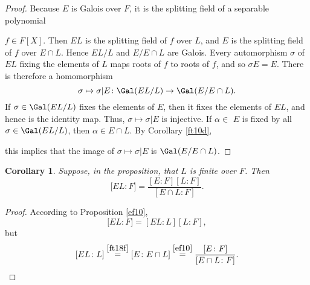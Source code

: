 \documentclass[a4paper,11pt,final,openany]{memoir}
\newtheorem{corollary}[X]{Corollary}
\theoremstyle{nonumberplain}
\newtheorem{proof}{Proof.}
\begin{document}
\begin{proof}
Because $E$ is Galois over $F$, it is the splitting field of a separable polynomial

$f\in F[X]$. Then $EL$ is the splitting field of $f$ over
$L$, and $E$ is the splitting field of $f$ over $E\cap L$. Hence $EL/L$ and
$E/E\cap L$ are Galois.
Every automorphism $\sigma$ of $EL$ fixing the elements of $L$ maps roots of $f$
to roots of $f$, and so $\sigma E=E$. There is therefore a homomorphism%
\[
\sigma\mapsto\sigma|E\colon\Gal(EL/L)\rightarrow\Gal(E/E\cap L)\text{.}%
\]
If $\sigma\in\Gal(EL/L)$ fixes the elements of $E$, then it fixes the elements
of $EL$, and hence is the identity map. Thus, $\sigma\mapsto\sigma|E$ is injective.
If $\alpha\in$ $E$ is fixed by all $\sigma\in\Gal(EL/L)$, then $\alpha\in
E\cap L$. By Corollary \ref{ft10d},
\begin{center}
\begin{minipage}[t]{1.5in}
\end{minipage}
\end{center}

\noindent this implies that the image of $\sigma\mapsto\sigma|E$ is
$\Gal(E/E\cap L)$.
\end{proof}

\begin{corollary}
\label{ft18g}Suppose, in the proposition, that $L$ is finite over $F$. Then%
\[
\lbrack EL\colon F]=\frac{[E\colon F][L\colon F]}{[E\cap L\colon F]}\text{.}%
\]

\end{corollary}

\begin{proof}
According to Proposition \ref{ef10},%
\[
\lbrack EL\colon F]=[EL\colon L][L\colon F],
\]
but%
\[
\lbrack EL\colon L]\overset{\ref{ft18f}}{=}[E\colon E\cap
L]\overset{\ref{ef10}}{=}\frac{[E\colon F]}{[E\cap L\colon F]}\text{.}%
\]

\end{proof}
\end{document}

